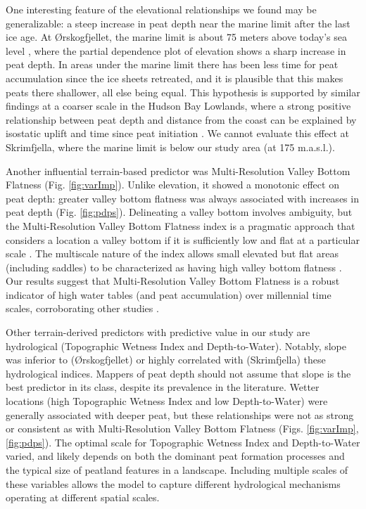\documentclass[soil, manuscript]{copernicus}
\begin{document}
One interesting feature of the elevational relationships we found may be generalizable: a steep increase in peat depth near the marine limit after the last ice age.
At Ørskogfjellet, the marine limit is about 75 meters above today's sea level \citep[Geological Survey of Norway,][]{hogaasDatabaseRegistreringAv2012}, where the partial dependence plot of elevation shows a sharp increase in peat depth.
In areas under the marine limit there has been less time for peat accumulation since the ice sheets retreated, and it is plausible that this makes peats there shallower, all else being equal.
This hypothesis is supported by similar findings at a coarser scale in the Hudson Bay Lowlands, where a strong positive relationship between peat depth and distance from the coast can be explained by isostatic uplift and time since peat initiation \citep{liPeatDepthCarbon2025}.
We cannot evaluate this effect at Skrimfjella, where the marine limit is below our study area (at 175 m.a.s.l.).

Another influential terrain-based predictor was Multi-Resolution Valley Bottom Flatness (Fig. \ref{fig:varImp}).
Unlike elevation, it showed a monotonic effect on peat depth: greater valley bottom flatness was always associated with increases in peat depth (Fig. \ref{fig:pdps}).
Delineating a valley bottom involves ambiguity, but the Multi-Resolution Valley Bottom Flatness index is a pragmatic approach that considers a location a valley bottom if it is sufficiently low and flat at a particular scale \citep{gallantMultiresolutionIndexValley2003}.
The multiscale nature of the index allows small elevated but flat areas (including saddles) to be characterized as having high valley bottom flatness \citep{gallantMultiresolutionIndexValley2003}.
Our results suggest that Multi-Resolution Valley Bottom Flatness is a robust indicator of high water tables (and peat accumulation) over millennial time scales, corroborating other studies \citep{rudiyantoOpenDigitalMapping2018, deragonMappingMaximumPeat2023}.

Other terrain-derived predictors with predictive value in our study are hydrological (Topographic Wetness Index and Depth-to-Water).
Notably, slope was inferior to (Ørskogfjellet) or highly correlated with (Skrimfjella) these hydrological indices.
Mappers of peat depth should not assume that slope is the best predictor in its class, despite its prevalence in the literature.
Wetter locations (high Topographic Wetness Index and low Depth-to-Water) were generally associated with deeper peat, but these relationships were not as strong or consistent as with Multi-Resolution Valley Bottom Flatness (Figs. \ref{fig:varImp}, \ref{fig:pdps}).
The optimal scale for Topographic Wetness Index and Depth-to-Water varied, and likely depends on both the dominant peat formation processes and the typical size of peatland features in a landscape.
Including multiple scales of these variables allows the model to capture different hydrological mechanisms operating at different spatial scales.
\end{document}
